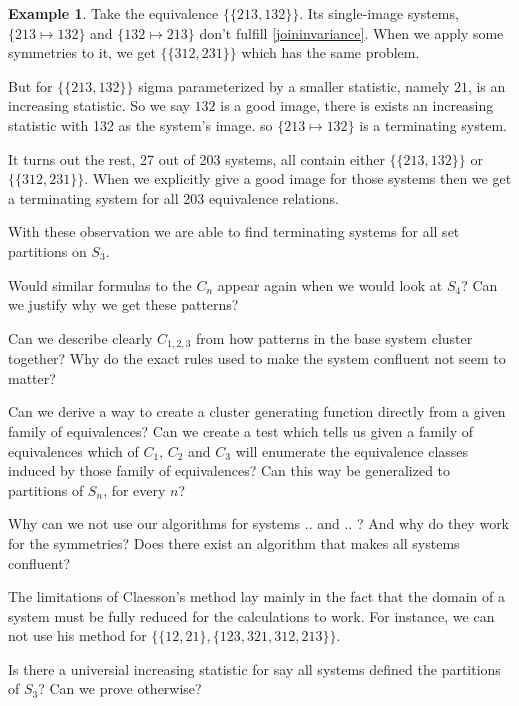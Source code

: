 \documentclass[openany, a4paper, 11pt, english]{article}
\newcommand{\patternrule}{ \mapsto \!}
\theoremstyle{definition}
\newtheorem{example}[theorem]{Example}
\newcommand{\Sym}{S}
\begin{document}
\begin{example}
    Take the equivalence $\{ \{ 213, 132 \} \}$. Its single-image systems,
    ${\{ 213 \patternrule 132 \}}$ and ${\{ 132 \patternrule 213 \}}$
    don't fulfill \eqref{joininvariance}.
    When we apply some symmetries to it, we get $\{ \{ 312, 231 \} \}$ which has the same problem.

    But for $\{ \{ 213, 132 \} \}$ sigma parameterized by a smaller statistic, namely $21$, is an
    increasing statistic. So we say $132$ is a good image, there is exists an
    increasing statistic with 132 as the system's image.
    so $\{ 213 \patternrule 132 \}$ is a terminating system.
\end{example}

It turns out the rest, 27 out of 203 systems, all contain either $\{ \{ 213, 132
\} \}$ or $\{ \{ 312, 231 \} \}$. When we explicitly give a good image for those
systems then we get a terminating system for all 203 equivalence relations.

With these observation we are able to find terminating systems for all set
partitions on $\Sym_3$.

Would similar formulas to the $C_n$ appear again when we would
look at $\Sym_4$? Can we justify why we get these patterns?

Can we describe clearly $C_{1,2,3}$ from how patterns in the base system cluster together?
Why do the exact rules used to make the system confluent not seem to matter?

Can we derive a way to create a cluster generating function directly from a
given family of equivalences? Can we create a test which tells us given a family
of equivalences which of $C_1$, $C_2$ and $C_3$ will enumerate the equivalence
classes induced by those family of equivalences?
Can this way be generalized to partitions of $\Sym_n$, for every $n$?

Why can we not use our algorithms for systems .. and .. ? And why do they work
for the symmetries? Does there exist an algorithm that makes all systems confluent?

The limitations of Claesson's method lay mainly in the fact that the domain of a
system must be fully reduced for the calculations to work. For instance, we can not use his
method for $\{ \{ 12, 21 \}, \{ 123, 321, 312, 213 \} \}$.

Is there a universial increasing statistic for say all systems defined the
partitions of $\Sym_3$? Can we prove otherwise?
\end{document}
